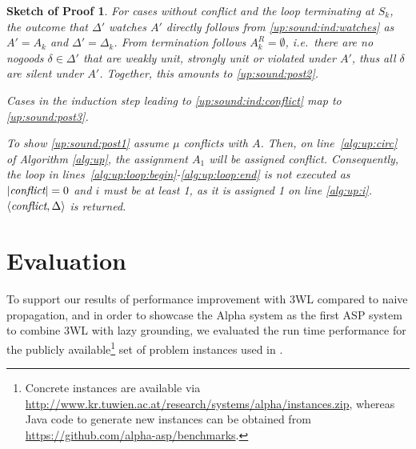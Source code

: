 \documentclass[final]{vutinfth} %
\newtheorem{proof-sketch}{Sketch of Proof}[chapter]
\newtheorem{theorem}{Theorem}[chapter]
\newcommand{\ass}{A}
\newcommand{\sgl}{\mu}
\begin{document}
\begin{proof-sketch}
For cases without conflict and the loop terminating at $S_k$, the outcome that $\Delta'$ watches $A'$ directly follows from \ref{up:sound:ind:watches} as $\ass' = \ass_k$ and $\Delta' = \Delta_k$. From termination follows $A_k^R = \emptyset$, i.e.~there are no nogoods $\delta \in \Delta'$ that are weakly unit, strongly unit or violated under $\ass'$, thus all $\delta$ are silent under $\ass'$. Together, this amounts to \ref{up:sound:post2}.

Cases in the induction step leading to \ref{up:sound:ind:conflict} map to \ref{up:sound:post3}.

To show \ref{up:sound:post1} assume $\sgl$ conflicts with $\ass$. Then, on line~\ref{alg:up:circ} of Algorithm \ref{alg:up}, the assignment $A_1$ will be assigned \emph{conflict}. Consequently, the loop in lines~\ref{alg:up:loop:begin}-\ref{alg:up:loop:end} is not executed as $|\emph{conflict}| = 0$ and $i$ must be at least 1, as it is assigned 1 on line \ref{alg:up:i}. $\langle \emph{conflict}, \Delta \rangle$ is returned.
\end{proof-sketch}




\chapter{Evaluation}
\label{chap:eval}

To support our results of performance improvement with 3WL compared to naive propagation, and in order to showcase the Alpha system as the first ASP system to combine 3WL with lazy grounding, we evaluated the run time performance for the publicly available\footnote{Concrete instances are available via \url{http://www.kr.tuwien.ac.at/research/systems/alpha/instances.zip}, whereas Java code to generate new instances can be obtained from \url{https://github.com/alpha-asp/benchmarks}.} set of problem instances used in \cite{alpha-techniques}.
\end{document}
